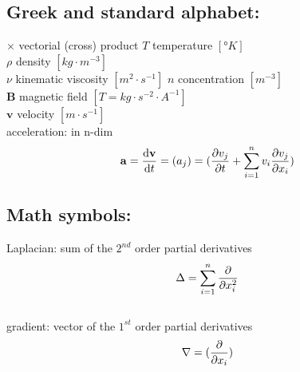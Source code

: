 \documentclass[a4paper,11pt]{article}
\begin{document}
	 \subsection{Greek and standard alphabet:}
$\times$ vectorial (cross) product
 $T$ temperature $[°K]$\\
 $\rho$ density $[kg \cdot m^{-3}]$\\
 $\nu$ kinematic viscosity $[m^2 \cdot s^{-1}]$
 $n$ concentration $[m^{-3}]$\\
 $\mathbf{B}$ magnetic field $[T=kg\cdot s^{-2}\cdot A^{-1}]$ \\
  $\mathbf{v}$ velocity $[m \cdot s^{-1}]$\\
 acceleration: in n-dim
 \[ \mathbf{a}= \dv{\mathbf{v}}{t}=(a_j)=(\pdv{v_j}{t}+ \sum_{i=1}^{n} v_i \pdv{v_j}{x_i} ) \]
 
 
 	\subsection{Math symbols:} %
 	
 Laplacian: sum of the $2^{nd}$ order partial derivatives\\
 \[ \Delta=\sum_{i=1}^{n} \pdv{}{x^2_i} \]  \\
 gradient: vector of the $1^{st}$ order partial derivatives\\
 \[ \nabla= (\pdv{}{x_i}) \]  \\
 
\end{document}
